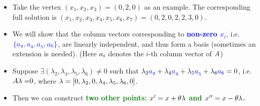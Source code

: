 \documentclass[mathserif]{beamer}
\begin{document}
{\begin{scriptsize}
\begin{itemize}
 \item Take the vertex $(x_1, x_2, x_3) = (0,2,0)$ as an example. The corresponding full solution is $(x_1,x_2,x_3,x_4,x_5,x_6,x_7)= ( 0, 2, 0, 2, 2, 3, 0)$. 
  \item We will show that the column vectors corresponding to \textcolor{blue}{\bf non-zero $x_i$}, i.e. $\mathnormal{ \textcolor{blue}{ \{a_2, a_4, a_5, a_6 \}}}$, are linearly independent, and thus form a basis (sometimes an extension is needed). (Here  $\mathnormal{a_i}$ denotes the $i$-th column vector of $\mathnormal{A}$)
  \item Suppose $\exists (\lambda_2, \lambda_4, \lambda_5,\lambda_6) \neq 0$ such that $\lambda_{2}\textcolor{blue}{\mathnormal{a_{2}}} + \lambda_{4}\textcolor{blue}{\mathnormal{a_{4}}} + \lambda_{5}\textcolor{blue}{\mathnormal{a_{5}}}+ \lambda_{6}\textcolor{blue}{\mathnormal{a_{6}}}  = 0$, i.e. $\mathnormal{A\lambda=}0$, where $\mathnormal{\lambda} = [0, \lambda_2, 0, \lambda_4, \lambda_5,\lambda_6, 0]$.
  \item Then we can construct \textcolor{green}{\bf two other points: $\mathnormal{x'=x+\theta \lambda}$ and $\mathnormal{x''=x-\theta \lambda}$. }

  
  \begin{figure}
\end{figure}
\end{itemize}
\end{scriptsize}}
\end{document}

